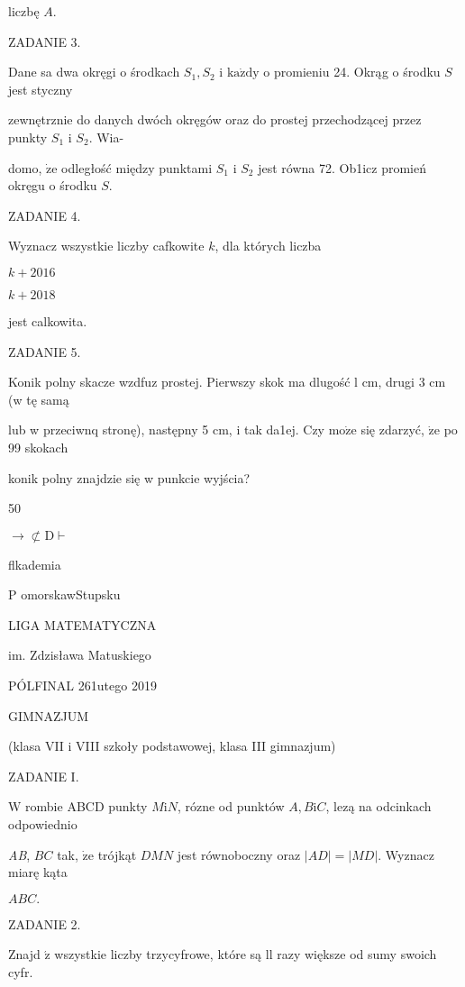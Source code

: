 \documentclass[a4paper,12pt]{article}
\begin{document}
liczbę $A.$

ZADANIE 3.

Dane sa dwa okręgi o środkach $S_{1}, S_{2}$ i $\mathrm{k}\mathrm{a}\dot{\mathrm{z}}\mathrm{d}\mathrm{y}$ o promieniu 24. Okrąg o środku $S$ jest styczny

zewnętrznie do danych dwóch okręgów oraz do prostej przechodzącej przez punkty $S_{1}$ i $S_{2}$. Wia-

domo, $\dot{\mathrm{z}}\mathrm{e}$ odległość między punktami $S_{1}$ i $S_{2}$ jest równa 72. Ob1icz promień okręgu o środku $S.$

ZADANIE 4.

Wyznacz wszystkie liczby cafkowite $k$, dla których liczba

$k+2016$

$k+2018$

jest calkowita.

ZADANIE 5.

Konik polny skacze wzdfuz prostej. Pierwszy skok ma dlugość l cm, drugi 3 cm (w tę samą

lub w przeciwnq stronę), następny 5 cm, i tak da1ej. Czy $\mathrm{m}\mathrm{o}\dot{\mathrm{z}}\mathrm{e}$ się zdarzyć, $\dot{\mathrm{z}}\mathrm{e}$ po 99 skokach

konik polny znajdzie się w punkcie wyjścia?






50

$\rightarrow\not\subset \mathrm{D}\vdash$

flkademia

P omorskawStupsku

LIGA MATEMATYCZNA

im. Zdzisława Matuskiego

PÓLFINAL 261utego 2019

GIMNAZJUM

(klasa VII i VIII szkoły podstawowej, klasa III gimnazjum)

ZADANIE I.

$\mathrm{W}$ rombie ABCD punkty $M\mathrm{i}N$, rózne od punktów $A, B\mathrm{i}C$, lezą na odcinkach odpowiednio

{\it AB}, $BC$ tak, $\dot{\mathrm{z}}\mathrm{e}$ trójkąt $DMN$ jest równoboczny oraz $|AD| = |MD|$. Wyznacz miarę kąta

$ABC.$

ZADANIE 2.

Znajd $\acute{\mathrm{z}}$ wszystkie liczby trzycyfrowe, które są ll razy większe od sumy swoich cyfr.
\end{document}
